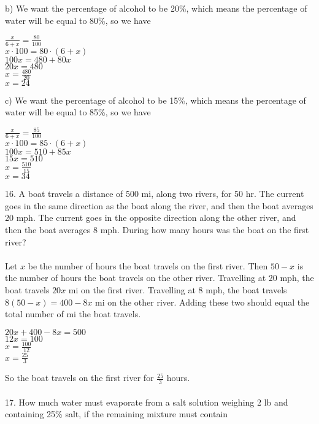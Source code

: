 \documentclass[12pt]{article}
\begin{document}
b) We want the percentage of alcohol to be 20\%, which means the percentage of water will be equal to 80\%, so we have
\begin{center}
$\displaystyle \frac{x}{6+x}=\displaystyle \frac{80}{100}$ \\
$x\cdot100=80\cdot(6+x)$ \\
$100x=480+80x$ \\
$20x=480$ \\
$x=\displaystyle \frac{480}{20}$ \\
$x=24$
\end{center}
c) We want the percentage of alcohol to be 15\%, which means the percentage of water will be equal to 85\%, so we have
\begin{center}
$\displaystyle \frac{x}{6+x}=\displaystyle \frac{85}{100}$ \\
$x\cdot100=85\cdot(6+x)$ \\
$100x=510+85x$ \\
$15x=510$ \\
$x=\displaystyle \frac{510}{15}$ \\
$x=34$
\end{center}
16. A boat travels a distance of 500 mi, along two rivers, for 50 hr. The current goes in the same direction as the boat along the river, and then the boat averages 20 mph. The current goes in the opposite direction along the other river, and then the boat averages 8 mph. During how many hours was the boat on the first river? \\
\\
Let $x$ be the number of hours the boat travels on the first river. Then $50-x$ is the number of hours the boat travels on the other river. Travelling at 20 mph, the boat travels $20x$ mi on the first river. Travelling at 8 mph, the boat travels $8(50-x)=400-8x$ mi on the other river. Adding these two should equal the total number of mi the boat travels.
\begin{center}
$20x+400-8x=500$ \\
$12x=100$ \\
$x=\displaystyle \frac{100}{12}$ \\
$x=\displaystyle \frac{25}{3}$
\end{center}
So the boat travels on the first river for $\displaystyle \frac{25}{3}$ hours. \\
\\
17. How much water must evaporate from a salt solution weighing 2 lb and containing 25\% salt, if the remaining mixture must contain \\
\end{document}
